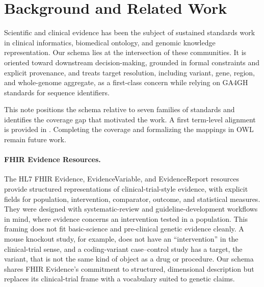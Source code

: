 %
%

\section{Background and Related Work}
\label{sec:supp-background}

Scientific and clinical evidence has been the subject of sustained standards
work in clinical informatics, biomedical ontology, and genomic knowledge
representation. Our schema lies at the intersection of these communities. It
is oriented toward downstream decision-making, grounded in formal constraints
and explicit provenance, and treats target resolution, including variant,
gene, region, and whole-genome aggregate, as a first-class concern while
relying on GA4GH standards for sequence identifiers.

This note positions the schema relative to seven families of standards and
identifies the coverage gap that motivated the work. A first term-level
alignment is provided in . Completing the coverage
and formalizing the mappings in OWL remain future work.

\paragraph{FHIR Evidence Resources.}
The HL7 FHIR Evidence, EvidenceVariable, and EvidenceReport
resources~\cite{fhir_evidence} provide structured representations of
clinical-trial-style evidence, with explicit fields for population,
intervention, comparator, outcome, and statistical measures. They were
designed with systematic-review and guideline-development workflows in mind,
where evidence concerns an intervention tested in a population. This framing
does not fit basic-science and pre-clinical genetic evidence cleanly. A mouse
knockout study, for example, does not have an ``intervention'' in the
clinical-trial sense, and a coding-variant case--control study has a target,
the variant, that is not the same kind of object as a drug or procedure. Our
schema shares FHIR Evidence's commitment to structured, dimensional
description but replaces its clinical-trial frame with a vocabulary suited to
genetic claims.

